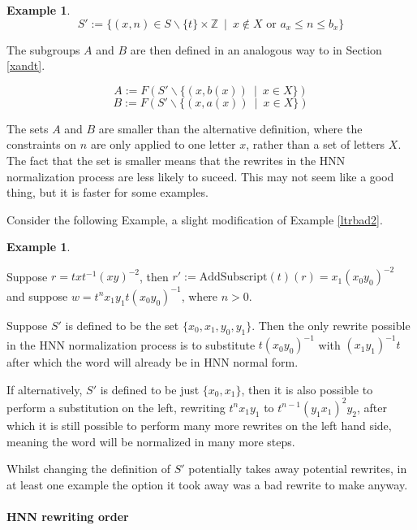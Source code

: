\documentclass[12pt]{article} %
\theoremstyle{definition}
\theoremstyle{definition}
\theoremstyle{definition}
\theoremstyle{definition}
\newtheorem{exmpl}[thm]{Example}
\begin{document}
\begin{exmpl}
\begin{equation}
  S' := \{(x, n) \in S \backslash \{t\} \times \mathbb{Z} \
\mid \ x \notin X \text{ or } a_x \le n \le b_x \}
\end{equation}

The subgroups $A$ and $B$ are then defined in an analogous way to in Section \ref{xandt}.

\begin{equation}
  A := F(S' \backslash \{(x, b (x)) \ \mid\  x \in X\})
\end{equation}
\begin{equation}
  B := F(S' \backslash \{(x, a (x)) \ \mid\  x \in X\})
\end{equation}

The sets $A$ and $B$ are smaller than the alternative definition, where the constraints
on $n$ are only applied to one letter $x$, rather than a set of letters $X$. The fact
that the set is smaller means that the rewrites in the HNN normalization process
are less likely to suceed. This may not seem like a good thing, but it is faster for
some examples.

Consider the following Example, a slight modification of Example \ref{ltrbad2}.

\begin{exmpl}\label{ltrbad3}

    Suppose $r = txt^{-1}(xy)^{-2}$,
    then $r' := \text{AddSubscript}(t)(r) = {x_1}(x_0y_0)^{-2}$ and
    suppose $w = t^n x_1y_1 t (x_0y_0)^{-1}$, where $n > 0$.

    Suppose $S'$ is defined to be the set $\{x_0, x_1, y_0, y_1\}$.
    Then the only rewrite possible in the HNN normalization
    process is to substitute $t(x_0y_0)^{-1}$ with
    $(x_1y_1)^{-1}t$ after which the word will already be in HNN
    normal form.

    If alternatively, $S'$ is defined to be just $\{x_0, x_1\}$,
    then it is also possible to perform a substitution on the left,
    rewriting $t^nx_1y_1$ to $t^{n-1}(y_1x_1)^2y_2$, after which it
    is still possible to perform many more rewrites on the left hand side,
    meaning the word will be normalized in many more steps.
\end{exmpl}

Whilst changing the definition of $S'$ potentially takes away potential
rewrites, in at least one example the option it took away was a bad
rewrite to make anyway.

\paragraph{HNN rewriting order}


\end{exmpl}
\end{document}
